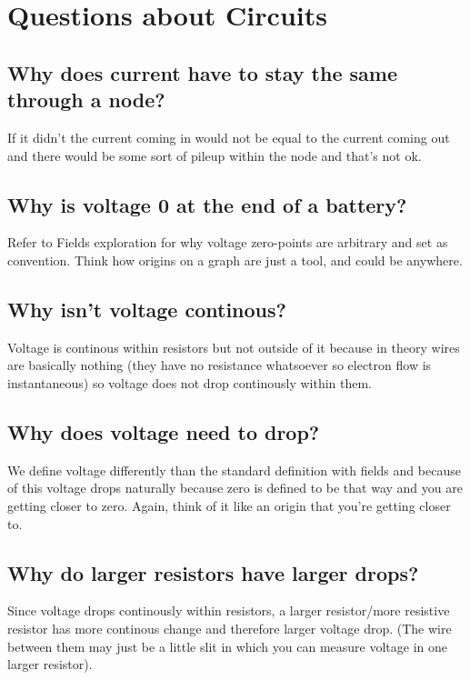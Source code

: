 \documentclass[letterpaper]{article}
\begin{document}
\section{Questions about Circuits}
\label{sec:org4846725}
\subsection{Why does current have to stay the same through a node?}
\label{sec:org4e6e0d2}
If it didn't the current coming in would not be equal to the current coming out and there would be some sort of pileup within the node and that's not ok.
\subsection{Why is voltage 0 at the end of a battery?}
\label{sec:org47eeeb6}
Refer to Fields exploration for why voltage zero-points are arbitrary and set as convention. Think how origins on a graph are just a tool, and could be anywhere.
\subsection{Why isn't voltage continous?}
\label{sec:org033835b}
Voltage is continous within resistors but not outside of it because in theory wires are basically nothing (they have no resistance whatsoever so electron flow is instantaneous) so voltage does not drop continously within them.
\subsection{Why does voltage need to drop?}
\label{sec:org909065d}
We define voltage differently than the standard definition with fields and because of this voltage drops naturally because zero is defined to be that way and you are getting closer to zero. Again, think of it like an origin that you're getting closer to.
\subsection{Why do larger resistors have larger drops?}
\label{sec:org840d5c6}
Since voltage drops continously within resistors, a larger resistor/more resistive resistor has more continous change and therefore larger voltage drop. (The wire between them may just be a little slit in which you can measure voltage in one larger resistor).
\end{document}
